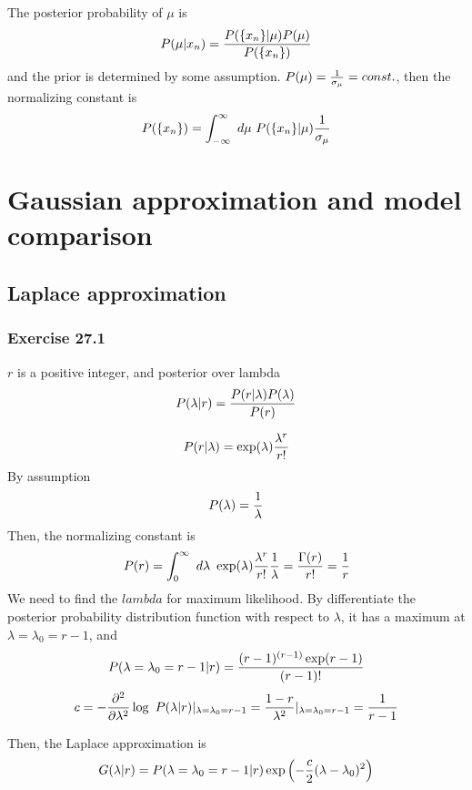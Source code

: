 \documentclass[a4paper,11pt]{article}
\numberwithin{equation}{section}
\begin{document}
{The posterior probability of $\mu$ is 
$$
P(\mu|x_n)={P(\{x_n\}|\mu)P(\mu)\over P(\{x_n\})}
$$
and the prior is determined by some assumption. 
$P(\mu) = {1 \over \sigma_{\mu}}=const.$, then the normalizing constant is  
$$
P(\{x_n\})=\int^{\infty}_{-\infty} ~d\mu ~P(\{x_n\}|\mu)  {1 \over \sigma_{\mu}}
$$




\section{Gaussian approximation and model comparison}

\subsection{Laplace approximation}
\subsubsection{Exercise 27.1}
$r$ is a positive integer, and posterior over lambda
$$
P(\lambda|r)= {P(r|\lambda) P(\lambda)\over P(r)}
$$

$$
P(r|\lambda)=\exp(\lambda){\lambda^r \over r!}
$$
By assumption
$$
P(\lambda)={1\over \lambda}
$$
Then, the normalizing constant is 
$$
P(r)=\int^{\infty}_0~d\lambda~ \exp(\lambda){\lambda^r \over r!}{1\over \lambda}= {\Gamma(r) \over r!} = {1\over r}
$$
We need to find the $lambda$ for maximum likelihood. By differentiate the posterior probability distribution function with respect to $\lambda$, 
it has a maximum at $\lambda = \lambda_0=r-1$, and 
$$
P(\lambda=\lambda_0=r-1|r)={(r-1)^{(r-1)}\exp(r-1)\over (r-1)!}
$$
$$
c=-{\partial^2 \over \partial \lambda^2}\log~P(\lambda|r)|_{\lambda=\lambda_0=r-1}={1-r \over \lambda^2}|_{\lambda=\lambda_0=r-1}={1\over r-1}
$$ 

Then, the Laplace approximation is 
$$
G(\lambda|r)= P(\lambda=\lambda_0=r-1|r)\exp\left(-{c\over 2}{(\lambda-\lambda_0)^2}\right)
$$


}
\end{document}
